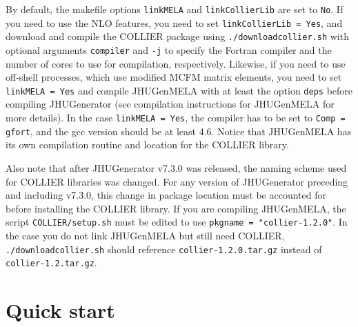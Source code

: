 \documentclass[aps,superscriptaddress,nofootinbib]{revtex4}
\begin{document}
By default, the makefile options \verb|linkMELA| and \verb|linkCollierLib| are set to \verb|No|. If you need to use the NLO features, you need to set \verb|linkCollierLib = Yes|, and download and compile the COLLIER package using \verb|./downloadcollier.sh| with optional arguments \verb|compiler| and \verb|-j| to specify the Fortran compiler and the number of cores to use for compilation, respectively. Likewise, if you need to use off-shell processes, which use modified MCFM matrix elements, you need to set \verb|linkMELA = Yes| and compile JHUGenMELA with at least the option \verb|deps| before compiling JHUGenerator (see compilation instructions for JHUGenMELA for more details). In the case \verb|linkMELA = Yes|, the compiler has to be set to \verb|Comp = gfort|, and the gcc version should be at least 4.6. Notice that JHUGenMELA has its own compilation routine and location for the COLLIER library.

Also note that after JHUGenerator v7.3.0 was released, the naming scheme used for COLLIER libraries was changed. For any version of JHUGenerator preceding and including v7.3.0, this change in package location must be accounted for before installing the COLLIER library. If you are compiling JHUGenMELA, the script \verb|COLLIER/setup.sh| must be edited to use \verb|pkgname = "collier-1.2.0"|. In the case you do not link JHUGenMELA but still need COLLIER, \verb|./downloadcollier.sh| should reference \verb|collier-1.2.0.tar.gz| instead of \verb|collier-1.2.tar.gz|.

\section{Quick start}
\end{document}
